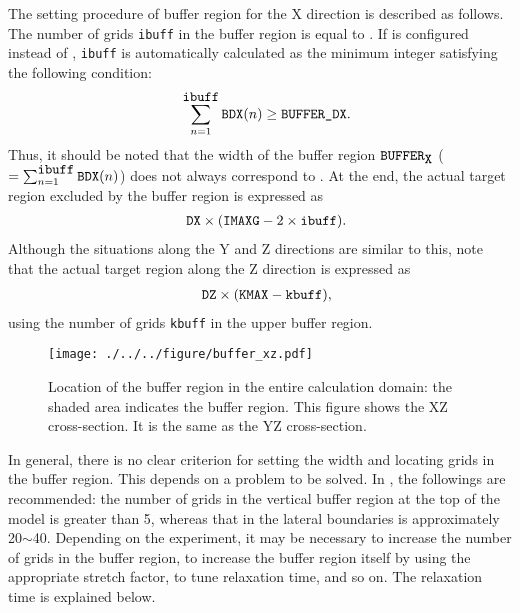 The setting procedure of buffer region for the X direction is described as follows.
The number of grids \verb|ibuff| in the buffer region is equal to .
If  is configured instead of , \verb|ibuff| is automatically calculated as the minimum integer satisfying the following condition:
%
\begin{eqnarray}
   && \sum_{n=1}^{\verb|ibuff|} \verb|BDX|(n) \ge \nmitemeq{BUFFER_DX}. \nonumber
\end{eqnarray}
%
Thus, it should be noted that the width of the buffer region $\verb|BUFFER|_{\verb|X|}$ ($= \sum_{n=1}^{\verb|ibuff|} \verb|BDX|(n)$) does not always correspond to . At the end, the actual target region excluded by the buffer region is expressed as
%
\begin{eqnarray}
   && \nmitemeq{DX} \times ( \nmitemeq{IMAXG} - 2 \times \verb|ibuff| ).
\end{eqnarray}
%
Although the situations along the Y and Z directions are similar to this, note that the actual target region along the Z direction is expressed as
%
\begin{eqnarray}
   && \nmitemeq{DZ} \times ( \nmitemeq{KMAX} - \verb|kbuff| ),
\end{eqnarray}
%
using the number of grids \verb|kbuff| in the upper buffer region.

\begin{figure}[t]
\begin{center}
  \texttt{[image: ./../../figure/buffer\_xz.pdf]}\\
  \caption{Location of the buffer region in the entire calculation domain: the shaded area indicates the buffer region. This figure shows the XZ cross-section. It is the same as the YZ cross-section.}
  \label{fig:buff_xz}
\end{center}
\end{figure}

In general, there is no clear criterion for setting the width and locating grids in the buffer region.
This depends on a problem to be solved.
In \scalerm, the followings are recommended: the number of grids in the vertical buffer region at the top of the model is greater than 5, whereas that in the lateral boundaries is approximately 20$\sim$40.
Depending on the experiment, it may be necessary to increase the number of grids in the buffer region, to increase the buffer region itself by using the appropriate stretch factor, to tune relaxation time, and so on.
The relaxation time is explained below.



